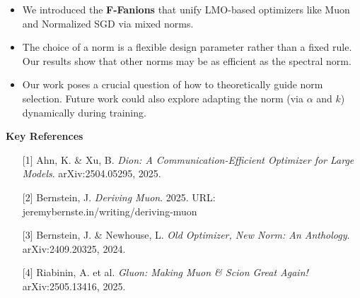\documentclass[fontsize=10pt]{beamer}
\begin{document}
\begin{frame}[fragile]
\begin{columns}[T]
\begin{column}{0.30\textwidth}
\begin{itemize}
    \item We introduced the \textbf{\color{HazySummerEve}F-Fanions} that unify LMO-based optimizers like Muon and Normalized SGD via mixed norms. 

    \item The choice of a norm is a flexible design parameter rather than a fixed rule. Our results show that other norms may be as efficient as the spectral norm.

    \item Our work poses a crucial question of how to theoretically guide norm selection. Future work could also explore adapting the norm (via $\alpha$ and $k$) dynamically during training.
\end{itemize}

\vspace{0.5em}
\textbf{\Huge\color{Zen}Key References}\\[0.6em]

\begin{itemize}
   \large
    \setlength{\itemsep}{0pt} %
    \item[{[1]}] Ahn, K. \& Xu, B. \textit{Dion: A Communication-Efficient Optimizer for Large Models}. arXiv:2504.05295, 2025.
    \item[{[2]}] Bernstein, J. \textit{Deriving Muon}. 2025. URL: jeremybernste.in/writing/deriving-muon
    \item[{[3]}] Bernstein, J. \& Newhouse, L. \textit{Old Optimizer, New Norm: An Anthology}. arXiv:2409.20325, 2024.
    \item[{[4]}] Riabinin, A. et al. \textit{Gluon: Making Muon \& Scion Great Again!} arXiv:2505.13416, 2025.
\end{itemize}

\end{column}
\hspace*{0.02\textwidth}%
\end{columns}

\end{frame}
\end{document}
